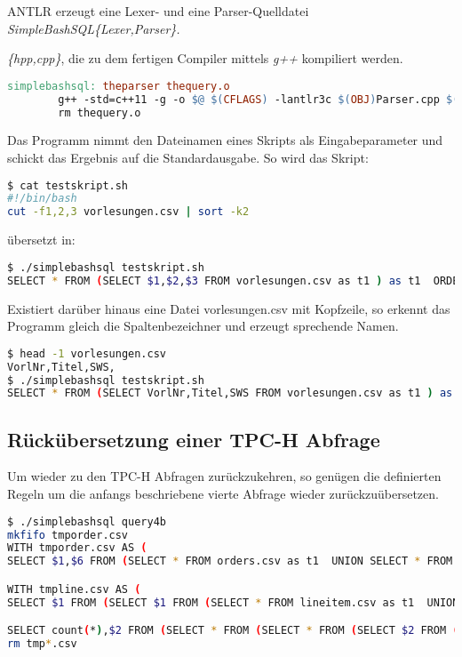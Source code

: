 ANTLR erzeugt eine Lexer- und eine Parser-Quelldatei \textit{SimpleBashSQL\{Lexer,Parser\}.}

\textit{\{hpp,cpp\}}, die zu dem fertigen Compiler mittels \textit{g++} kompiliert werden.

\begin{lstlisting}[language=make]
simplebashsql: theparser thequery.o
        g++ -std=c++11 -g -o $@ $(CFLAGS) -lantlr3c $(OBJ)Parser.cpp $(OBJ)Lexer.cpp thequery.o
        rm thequery.o
\end{lstlisting}

Das Programm nimmt den Dateinamen eines Skripts als Eingabeparameter und schickt das Ergebnis auf die Standardausgabe. So wird das Skript:
\begin{lstlisting}[language=Bash]
$ cat testskript.sh
#!/bin/bash
cut -f1,2,3 vorlesungen.csv | sort -k2
\end{lstlisting}
übersetzt in:
\begin{lstlisting}[language=Bash]
$ ./simplebashsql testskript.sh
SELECT * FROM (SELECT $1,$2,$3 FROM vorlesungen.csv as t1 ) as t1  ORDER BY $2
\end{lstlisting}

Existiert darüber hinaus eine Datei vorlesungen.csv mit Kopfzeile, so erkennt das Programm gleich die Spaltenbezeichner und erzeugt sprechende Namen.
\begin{lstlisting}[language=Bash]
$ head -1 vorlesungen.csv
VorlNr,Titel,SWS,
$ ./simplebashsql testskript.sh
SELECT * FROM (SELECT VorlNr,Titel,SWS FROM vorlesungen.csv as t1 ) as t1  ORDER BY Titel
\end{lstlisting}

\subsection{Rückübersetzung einer TPC-H Abfrage}
Um wieder zu den TPC-H Abfragen zurückzukehren, so genügen die definierten Regeln um die anfangs beschriebene vierte Abfrage wieder zurückzuübersetzen.
\begin{lstlisting}[language=Bash]
$ ./simplebashsql query4b
mkfifo tmporder.csv
WITH tmporder.csv AS (
SELECT $1,$6 FROM (SELECT * FROM orders.csv as t1  UNION SELECT * FROM (SELECT * FROM orders.tbl as t1  ORDER BY $1,$1) as t1union1 ) as t1  WHERE (true) AND ($5<'1993-10-01') AND ($5>='1993-07-01')  )

WITH tmpline.csv AS (
SELECT $1 FROM (SELECT $1 FROM (SELECT * FROM lineitem.csv as t1  UNION SELECT * FROM (SELECT * FROM lineitem.tbl as t1  ORDER BY $1,$1) as t1union1 ) as t1  WHERE (true) AND ($12<$13) ) as t1  GROUP BY $1 )

SELECT count(*),$2 FROM (SELECT * FROM (SELECT * FROM (SELECT $2 FROM (SELECT $1,$2,$3,$4,$5,$6,$7,$8,$9 FROM tmporder.csv as t1, tmpline.csv as t2  WHERE (t1.$1=t2.$10) ) as t1 ) as t1 ) as t1 ) as t1  GROUP BY $2
rm tmp*.csv
\end{lstlisting}

